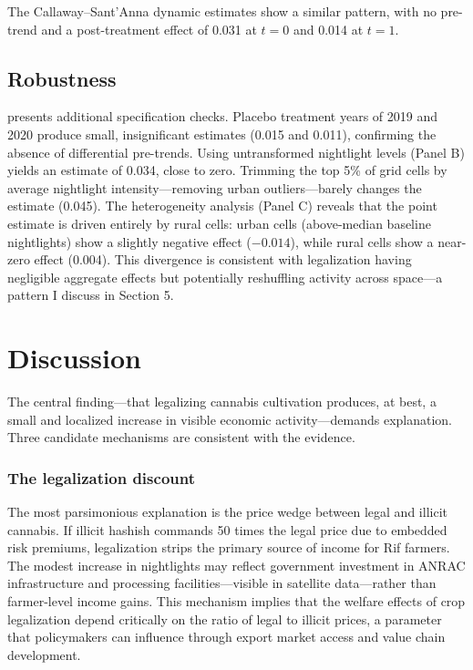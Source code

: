 \documentclass[12pt]{article}
\begin{document}
The Callaway--Sant'Anna dynamic estimates show a similar pattern, with no pre-trend and a post-treatment effect of 0.031 at $t = 0$ and 0.014 at $t = 1$.



\subsection{Robustness}

 presents additional specification checks. Placebo treatment years of 2019 and 2020 produce small, insignificant estimates (0.015 and 0.011), confirming the absence of differential pre-trends. Using untransformed nightlight levels (Panel B) yields an estimate of 0.034, close to zero. Trimming the top 5\% of grid cells by average nightlight intensity---removing urban outliers---barely changes the estimate (0.045). The heterogeneity analysis (Panel C) reveals that the point estimate is driven entirely by rural cells: urban cells (above-median baseline nightlights) show a slightly negative effect ($-0.014$), while rural cells show a near-zero effect (0.004). This divergence is consistent with legalization having negligible aggregate effects but potentially reshuffling activity across space---a pattern I discuss in Section 5.




\section{Discussion}

The central finding---that legalizing cannabis cultivation produces, at best, a small and localized increase in visible economic activity---demands explanation. Three candidate mechanisms are consistent with the evidence.

\subsubsection*{The legalization discount} The most parsimonious explanation is the price wedge between legal and illicit cannabis. If illicit hashish commands 50 times the legal price due to embedded risk premiums, legalization strips the primary source of income for Rif farmers. The modest increase in nightlights may reflect government investment in ANRAC infrastructure and processing facilities---visible in satellite data---rather than farmer-level income gains. This mechanism implies that the welfare effects of crop legalization depend critically on the ratio of legal to illicit prices, a parameter that policymakers can influence through export market access and value chain development.
\end{document}

